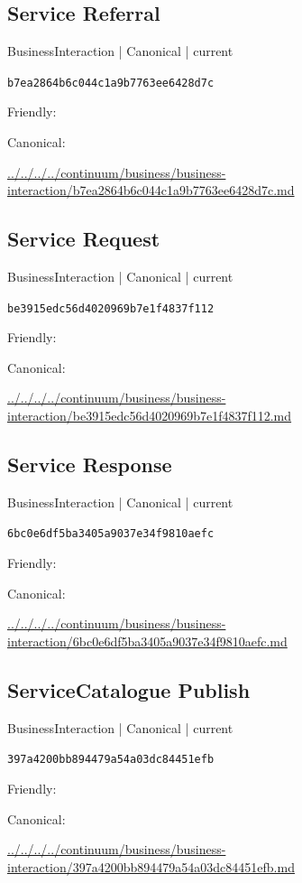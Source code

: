 \documentclass[10pt,a4paper]{article}
\begin{document}
\subsection*{Service Referral}
{\small BusinessInteraction | Canonical | current}\par
\texttt{b7ea2864b6c044c1a9b7763ee6428d7c}\par
Friendly: \par
Canonical: \par
{\footnotesize\url{../../../../continuum/business/business-interaction/b7ea2864b6c044c1a9b7763ee6428d7c.md}}\par
\subsection*{Service Request}
{\small BusinessInteraction | Canonical | current}\par
\texttt{be3915edc56d4020969b7e1f4837f112}\par
Friendly: \par
Canonical: \par
{\footnotesize\url{../../../../continuum/business/business-interaction/be3915edc56d4020969b7e1f4837f112.md}}\par
\subsection*{Service Response}
{\small BusinessInteraction | Canonical | current}\par
\texttt{6bc0e6df5ba3405a9037e34f9810aefc}\par
Friendly: \par
Canonical: \par
{\footnotesize\url{../../../../continuum/business/business-interaction/6bc0e6df5ba3405a9037e34f9810aefc.md}}\par
\subsection*{ServiceCatalogue Publish}
{\small BusinessInteraction | Canonical | current}\par
\texttt{397a4200bb894479a54a03dc84451efb}\par
Friendly: \par
Canonical: \par
{\footnotesize\url{../../../../continuum/business/business-interaction/397a4200bb894479a54a03dc84451efb.md}}\par
\end{document}
